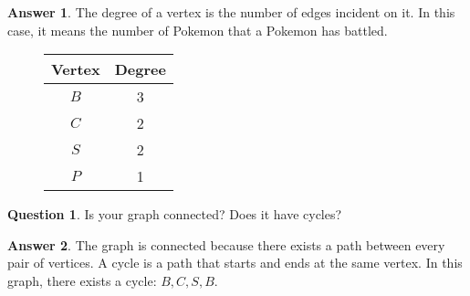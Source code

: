 \documentclass[article, 12pt]{article}
\theoremstyle{definition}
\newtheorem{question}{Question}
\newtheorem{answer}{Answer}
\begin{document}
    \begin{answer} The degree of a vertex is the number of edges incident on it. In this case, it means the number of Pokemon that a Pokemon has battled.
        \begin{figure}[H]
            \centering
            \begin{tabular}{|c|c|}
                \hline
                Vertex & Degree \\
                \hline
                $B$ & 3 \\
                $C$ & 2 \\
                $S$ & 2 \\
                $P$ & 1 \\
                \hline
            \end{tabular}
        \end{figure}
    \end{answer}
    \begin{question}
        Is your graph connected? Does it have cycles?
    \end{question}
    \begin{answer}
        The graph is connected because there exists a path between every pair of vertices. A cycle is a path that starts and ends at the same vertex. In this graph, there exists a cycle: $B, C, S, B$.
    \end{answer}
\end{document}
